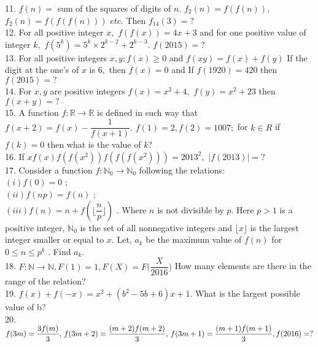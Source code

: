 \documentclass[a4paper,11pt]{article}
\begin{document}
11. $f(n)=$ sum of the squares of digits of $n.$ $f_{2}(n) = f(f(n)),$ $f_{2}(n) = f(f(f(n)))$ $etc.$ Then $f_{14}(3) = ?$\\

12. For all positive integer $x,$ $f(f(x)) = 4x+3$ and for one positive value of integer $k,$ $f(5^k) = 5^k \times 2^{k-2} + 2^{k-3}.$ $f(2015) = ?$\\

13. For all positive integers $x,y; f(x) \ge 0$ and $f(xy) = f(x) + f(y) $ If the digit at the one’s of  $x$ is $6,$ then $f(x) = 0$ and If $f(1920) = 420 $ then $f(2015)=?$\\

14. For $x,y$ are positive integers $f(x) = x^2 + 4, $  $f(y) = x^2+23$ then $f(x+y)=?$\\

15. A function $f: \mathbb{R} \to \mathbb{R}$ is defined in such way that $f(x+2) = f(x) - \dfrac{1}{f(x+1)}. $  $f(1)=2, f(2) = 1007; $ for $k \in R$ if $f(k) = 0$ then what is the value of $k?$\\

16. If $xf(x)f(f(x^2))f(f(f(x^2))) = 2013^2,$  $\mid f(2013) \mid=?$\\

17. Consider a function $f: \mathbb{N}_{0} \to \mathbb{N}_{0}$ following the relations:\\
$(i) f (0) =0$ ;\\ $(ii) f (np) =f (n)$ ;\\ $(iii) f(n) = n + f( \lfloor \dfrac {n}{p} \rfloor)$ . Where $n$ is not divisible by $p$.
Here $p > 1$ is a positive integer, $ \mathbb{N}_{0}$ is the set of all nonnegative integers and $\lfloor x \rfloor$ is the largest integer smaller or equal to $x$. Let, $a_{k}$ be the maximum value of $f (n)$ for $0 \le n \le p^k$ . Find $a_{k}$.\\

18. $F: \mathbb{N}\rightarrow \mathbb{N}, F(1)=1, F(X) = F\Bigg(\dfrac{X}{2016}\Bigg) $ How many elements are there in the range of the relation?\\

19. $ f(x) + f (-x) = x^2 + (b^2-5b + 6)x +1.$ What is the largest possible value of b?\\

20. $f(3m) = \dfrac{3f(m)}{3},\, f(3m+2)= \dfrac{(m+2)f(m+2)}{3},\, f(3m+1)= \dfrac{(m+1)f(m+1)}{3},\, \\f(2016)=?$\\
\end{document}
